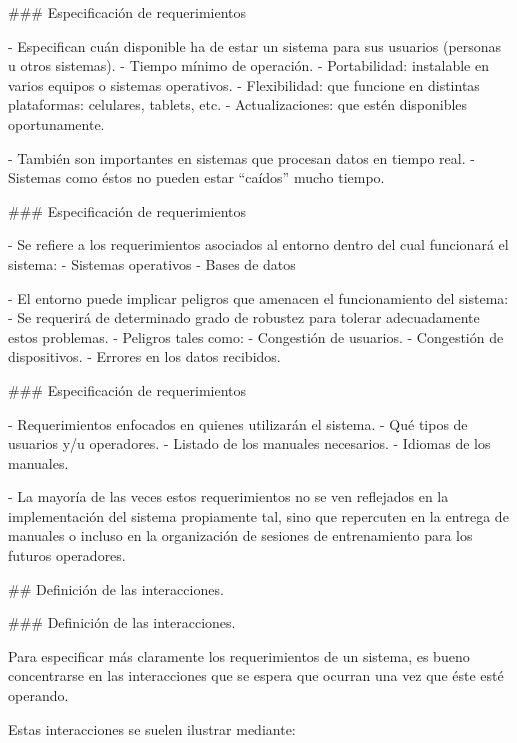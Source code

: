 ### Especificación de requerimientos


- Especifican cuán disponible ha de estar un sistema para sus usuarios (personas u
otros sistemas).
    - Tiempo mínimo de operación.
    - Portabilidad: instalable en varios equipos o sistemas operativos.
    - Flexibilidad: que funcione en distintas plataformas: celulares, tablets, etc.
    - Actualizaciones: que estén disponibles oportunamente.

- También son importantes en sistemas que procesan datos en tiempo real.
    - Sistemas como éstos no pueden estar ``caídos'' mucho tiempo.

### Especificación de requerimientos


- Se refiere a los requerimientos asociados al entorno dentro del cual funcionará el sistema:
    - Sistemas operativos
    - Bases de datos

- El entorno puede implicar peligros que amenacen el funcionamiento del sistema:
    - Se requerirá de determinado grado de robustez para tolerar adecuadamente estos problemas.
    - Peligros tales como:
        - Congestión de usuarios.
        - Congestión de dispositivos.
        - Errores en los datos recibidos.

### Especificación de requerimientos


- Requerimientos enfocados en quienes utilizarán el sistema.
    - Qué tipos de usuarios y/u operadores.
    - Listado de los manuales necesarios.
    - Idiomas de los manuales.

- La mayoría de las veces estos requerimientos no se ven reflejados en la implementación
del sistema propiamente tal, sino que repercuten en la entrega de manuales o incluso en
la organización de sesiones de entrenamiento para los futuros operadores.

## Definición de las interacciones.

### Definición de las interacciones.

Para especificar más claramente los requerimientos de un sistema, es bueno concentrarse en
las interacciones que se espera que ocurran una vez que éste esté operando.\newline

Estas interacciones se suelen ilustrar mediante:

